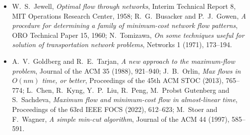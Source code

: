 \begin{itemize}
\item W.~S.~Jewell, \emph{Optimal flow through networks}, Interim Technical Report 8, MIT Operations Research Center, 1958; R.~G.~Busacker and P.~J.~Gowen, \emph{A procedure for determining a family of minimum-cost network flow patterns}, ORO Technical Paper 15, 1960; N.~Tomizawa, \emph{On some techniques useful for solution
of transportation network problems}, Networks 1 (1971), 173--194.
\item A.~V.~Goldberg and R.~E.~Tarjan, \emph{A new approach to the maximum-flow problem}, Journal of the ACM 35 (1988), 921--940; J.~B.~Orlin, \emph{Max flows in $O(nm)$ time, or better}, Proceedings of the 45th ACM STOC (2013), 765--774; L.~Chen, R.~Kyng, Y.~P.~Liu, R.~Peng, M.~Probst Gutenberg and S.~Sachdeva,
\emph{Maximum flow and minimum-cost flow in almost-linear time}, Proceedings of the 63rd IEEE FOCS (2022), 612--623; M.~Stoer and F.~Wagner, \emph{A simple min-cut algorithm}, Journal of the ACM 44 (1997), 585--591.
\end{itemize}
